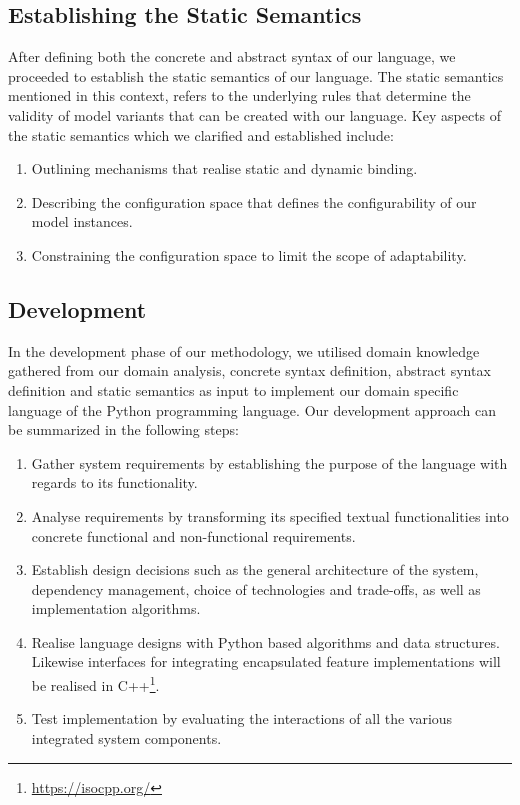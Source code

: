 \documentclass[conference]{IEEEtran}
\newcommand{\foot}[1]{\footnote{\url{#1}}}
\begin{document}
\subsection{Establishing the Static Semantics}
After defining both the concrete and abstract syntax of our language, we proceeded to establish the static semantics of our language. The static semantics mentioned in this context, refers to the underlying rules that determine the validity of model variants that can be created with our language. Key aspects of the static semantics which we clarified and established include:
\begin{enumerate}
    \item Outlining mechanisms that realise static and dynamic binding.
    \item Describing the configuration space that defines the configurability of our model instances.
    \item Constraining the configuration space to limit the scope of adaptability.
\end{enumerate}

\subsection{Development}
In the development phase of our methodology, we utilised domain knowledge gathered from our domain analysis, concrete syntax definition, abstract syntax definition and static semantics as input to implement our domain specific language of the Python programming language. Our development approach can be summarized in the following steps:
\begin{enumerate}
    \item Gather system requirements by establishing the purpose of the language with regards to its functionality.
    \item Analyse requirements by transforming its specified textual functionalities into concrete functional and non-functional requirements.
    \item Establish design decisions such as the general architecture of the system, dependency management, choice of technologies and trade-offs, as well as implementation algorithms.
    \item Realise language designs with Python based algorithms and data structures. Likewise interfaces for integrating encapsulated feature implementations will be realised in  C++\foot{https://isocpp.org/}.
    \item Test implementation by evaluating the interactions of all the various integrated system components.
 \end{enumerate}
 
\end{document}
